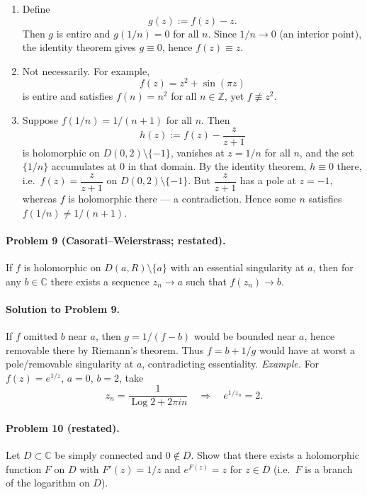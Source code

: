 \documentclass[11pt,a4paper]{article}
\theoremstyle{definition}
\theoremstyle{definition}
\theoremstyle{plain}
\theoremstyle{remark}
\DeclareMathOperator{\Log}{Log}
\begin{document}
\begin{enumerate}[label=(\roman*)]
	\item Define
	\[
	g(z):=f(z)-z .
	\]
	Then $g$ is entire and $g(1/n)=0$ for all $n$. Since $1/n\to 0$ (an interior point),
	the identity theorem gives $g\equiv 0$, hence $f(z)\equiv z$.
	
	\medskip
	\item Not necessarily. For example,
	\[
	f(z)=z^{2}+\sin(\pi z)
	\]
	is entire and satisfies $f(n)=n^{2}$ for all $n\in\mathbb Z$, yet $f\not\equiv z^{2}$.
	
	\medskip
	\item Suppose $f(1/n)=1/(n+1)$ for all $n$. Then
	\[
	h(z):=f(z)-\frac{z}{z+1}
	\]
	is holomorphic on $D(0,2)\setminus\{-1\}$, vanishes at $z=1/n$ for all $n$, and the set $\{1/n\}$ accumulates at $0$ in that domain.
	By the identity theorem, $h\equiv 0$ there, i.e.\ $f(z)=\dfrac{z}{z+1}$ on $D(0,2)\setminus\{-1\}$.
	But $\dfrac{z}{z+1}$ has a pole at $z=-1$, whereas $f$ is holomorphic there — a contradiction.
	Hence some $n$ satisfies $f(1/n)\ne 1/(n+1)$.
\end{enumerate}

\bigskip
\paragraph{Problem 9 (Casorati--Weierstrass; restated).}
If $f$ is holomorphic on $D(a,R)\setminus\{a\}$ with an essential singularity at $a$, then for any $b\in\mathbb C$
there exists a sequence $z_n\to a$ such that $f(z_n)\to b$.

\medskip
\paragraph{Solution to Problem 9.}
If $f$ omitted $b$ near $a$, then $g=1/(f-b)$ would be bounded near $a$, hence removable there by Riemann’s theorem.
Thus $f=b+1/g$ would have at worst a pole/removable singularity at $a$, contradicting essentiality.
\emph{Example.} For $f(z)=e^{1/z}$, $a=0$, $b=2$, take
\[
z_n=\frac{1}{\Log 2+2\pi i n}\quad\Rightarrow\quad e^{1/z_n}=2 .
\]

\bigskip
\paragraph{Problem 10 (restated).}
Let $D\subset\mathbb C$ be simply connected and $0\notin D$.
Show that there exists a holomorphic function $F$ on $D$ with $F'(z)=1/z$ and $e^{F(z)}=z$ for $z\in D$
(i.e.\ $F$ is a branch of the logarithm on $D$).
\end{document}
